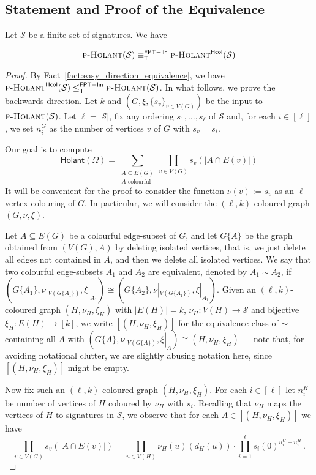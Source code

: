 \documentclass[authorcolumns,numberwithinsect]{no-lipics-v2022}
\newcommand{\fptlinred}{\leq^{\mathsf{FPT-lin}}_{\mathsf{T}}}
\newcommand{\fptinterlinred}{\equiv^{\mathsf{FPT-lin}}_{\mathsf{T}}}
\newcommand{\holantprob}{\text{\sc{p-Holant}}}
\newcommand{\holantprobstar}{\text{\sc{p-Holant}}^{\mathsf{Hcol}}}
\newcommand{\holant}{\mathsf{Holant}}
\begin{document}
\subsection{Statement and Proof of the Equivalence}

\begin{lemma}\label{lem:main_equivalence_hard}
    Let $\mathcal{S}$ be a finite set of signatures. We have
    
    \[ \holantprob(\mathcal{S}) \fptinterlinred \holantprobstar(\mathcal{S}) \]
\end{lemma}
\begin{proof}
By Fact~\ref{fact:easy_direction_equivalence}, we have $\holantprobstar(\mathcal{S}) \fptlinred \holantprob(\mathcal{S})$. In what follows, we prove the backwards direction.
    Let $k$ and $(G,\xi,\{s_v\}_{v\in V(G)})$ be the input to $\textsc{p-Holant}(\mathcal{S})$.
    Let $\ell=|\mathcal{S}|$, fix any ordering $s_1,\dots,s_\ell$ of $\mathcal{S}$ and, for each $i\in[\ell]$, we set $n^G_i$ as the number of vertices $v$ of $G$ with $s_v=s_i$. 
    
    Our goal is to compute 
     \[ \holant(\Omega) = \sum_{\substack{A \subseteq E(G)\\ A \text{ colourful}}} \prod_{v\in V(G)} s_v(|A \cap E(v)|) \]
     It will be convenient for the proof to consider the function $\nu(v):=s_v$ as an $\ell$-vertex colouring of $G$. In particular, we will consider the $(\ell,k)$-coloured graph $(G,\nu,\xi)$.

     Let $A\subseteq E(G)$ be a colourful edge-subset of $G$, and let $G\{A\}$ be the graph obtained from $(V(G),A)$ by deleting isolated vertices, that is, we just delete all edges not contained in $A$, and then we delete all isolated vertices. We say that two colourful edge-subsets $A_1$ and $A_2$ are equivalent, denoted by $A_1 \sim A_2$, if $(G\{A_1\},\nu|_{V(G\{A_1\})},\xi|_{A_1}) \cong (G\{A_2\},\nu|_{V(G\{A_1\})},\xi|_{A_1})$. Given an $(\ell,k)$-coloured graph $(H,\nu_H,\xi_H)$ with $|E(H)|=k$, $\nu_H: V(H) \to \mathcal{S}$ and bijective $\xi_H: E(H) \to [k]$, we write $[(H,\nu_H,\xi_H)]$ for the equivalence class of $\sim$ containing all $A$ with $(G\{A\},\nu|_{V(G\{A\})},\xi|_{A}) \cong (H,\nu_H,\xi_H)$ --- note that, for avoiding notational clutter, we are slightly abusing notation here, since $[(H,\nu_H,\xi_H)]$ might be empty.

     Now fix such an $(\ell,k)$-coloured graph $(H,\nu_H,\xi_H)$. For each $i\in[\ell]$ let $n^H_i$ be number of vertices of $H$ coloured by $\nu_H$ with $s_i$. Recalling that $\nu_H$ maps the vertices of $H$ to signatures in $\mathcal{S}$, we observe that for each $A\in [(H,\nu_H,\xi_H)]$ we have
     \[ \prod_{v\in V(G)}s_v(|A \cap E(v)|)= \prod_{u \in V(H)}\nu_H(u)(d_H(u)) \cdot \prod_{i=1}^\ell s_i(0)^{n^G_i-n^H_i}  \,.\]


\end{proof}
\end{document}
